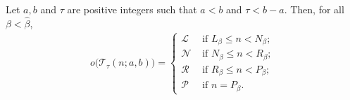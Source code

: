 \documentclass[oneside,reqno]{amsart}
\newcommand{\ts}{\mathcal{T}}
\newcommand{\lp}{\mathscr{L}}
\newcommand{\rp}{\mathscr{R}}
\newcommand{\np}{\mathscr{N}}
\newcommand{\pp}{\mathscr{P}}
\newcommand{\hbeta}{\widehat\beta}
\begin{document}
\begin{lemma}\label{lem: outcome ts below alpha block}
    Let $a,b$ and $\tau$ are positive integers such that $a<b$ and $\tau<b-a$. Then, for all $\beta<\hbeta$, %
    \begin{align*}
        o\big(\ts_\tau(n;a,b)\big)=\begin{cases}
            \lp & \text{ if } L_\beta \le  n<N_\beta ;\\
            \np & \text{ if } N_\beta\le  n< R_\beta;\\
            \rp & \text{ if } R_\beta\le  n< P_\beta;\\
            \pp & \text{ if } n=P_\beta.
        \end{cases}
    \end{align*}
\end{lemma}
\end{document}
